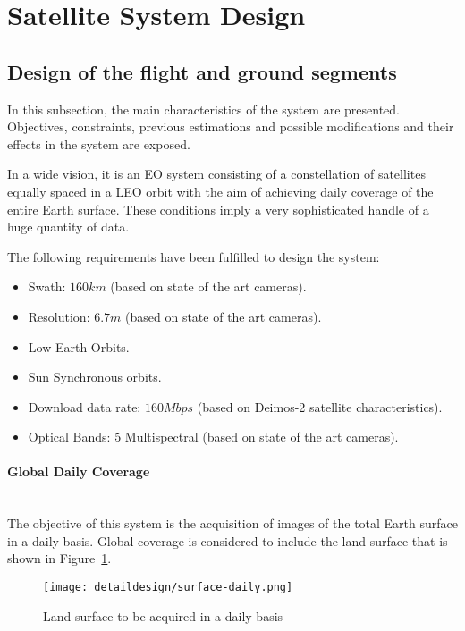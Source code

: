 
\section{Satellite System Design}
\label{subsec:system-design}
\subsection{Design of the flight and ground segments}
\label{subsubsec:design-flight-ground}
In this subsection, the main characteristics of the system are presented. Objectives, constraints, previous estimations and possible modifications and their effects in the system are exposed.

In a wide vision, it is an \ac{EO} system consisting of a constellation of satellites equally spaced in a \ac{LEO} orbit with the aim of achieving daily coverage of the entire Earth surface. These conditions imply a very sophisticated handle of a huge quantity of data.

The following requirements have been fulfilled to design the system:
\begin{itemize}
\item Swath: $160km$ (based on state of the art cameras).
\item Resolution: $6.7m$ (based on state of the art cameras).
\item Low Earth Orbits.
\item Sun Synchronous orbits.
\item Download data rate: $160 Mbps$ (based on Deimos-2 satellite characteristics).
\item Optical Bands: 5 Multispectral (based on state of the art cameras).
\end{itemize}

\paragraph{Global Daily Coverage}~\\
The objective of this system is the acquisition of images of the total Earth surface in a daily basis. Global coverage is considered to include the land surface that is shown in Figure~\ref{fig:intr-land-surface}.


\begin{figure}[!h]
\begin{center}
\texttt{[image: detaildesign/surface-daily.png]}
\caption{Land surface to be acquired in a daily basis}
\label{fig:intr-land-surface}
\end{center}
\end{figure}


